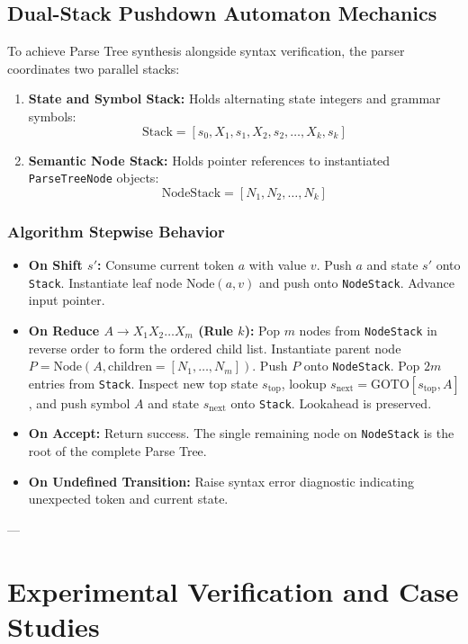 \documentclass[11pt,a4paper]{article}
\begin{document}
\subsection{Dual-Stack Pushdown Automaton Mechanics}
To achieve Parse Tree synthesis alongside syntax verification, the parser coordinates two parallel stacks:
\begin{enumerate}
    \item \textbf{State and Symbol Stack:} Holds alternating state integers and grammar symbols:
    $$\text{Stack} = [s_0, X_1, s_1, X_2, s_2, \dots, X_k, s_k]$$
    \item \textbf{Semantic Node Stack:} Holds pointer references to instantiated \texttt{ParseTreeNode} objects:
    $$\text{NodeStack} = [N_1, N_2, \dots, N_k]$$
\end{enumerate}

\subsubsection{Algorithm Stepwise Behavior}
\begin{itemize}
    \item \textbf{On Shift $s'$:} 
    Consume current token $a$ with value $v$. Push $a$ and state $s'$ onto \texttt{Stack}. Instantiate leaf node $\text{Node}(a, v)$ and push onto \texttt{NodeStack}. Advance input pointer.
    \item \textbf{On Reduce $A \to X_1 X_2 \dots X_m$ (Rule $k$):} 
    Pop $m$ nodes from \texttt{NodeStack} in reverse order to form the ordered child list. Instantiate parent node $P = \text{Node}(A, \text{children}=[N_1, \dots, N_m])$. Push $P$ onto \texttt{NodeStack}. Pop $2m$ entries from \texttt{Stack}. Inspect new top state $s_{\text{top}}$, lookup $s_{\text{next}} = \text{GOTO}[s_{\text{top}}, A]$, and push symbol $A$ and state $s_{\text{next}}$ onto \texttt{Stack}. Lookahead is preserved.
    \item \textbf{On Accept:} 
    Return success. The single remaining node on \texttt{NodeStack} is the root of the complete Parse Tree.
    \item \textbf{On Undefined Transition:} 
    Raise syntax error diagnostic indicating unexpected token and current state.
\end{itemize}

---

\section{Experimental Verification and Case Studies}
\end{document}
